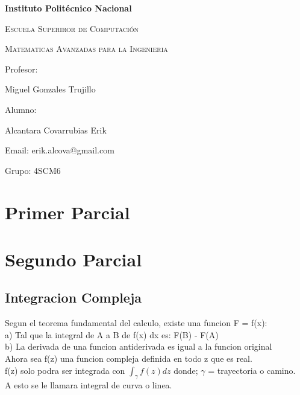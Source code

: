 \documentclass{article}
\begin{document}
\begin{titlepage}
\centering

{\bfseries\LARGE Instituto Polit\'ecnico Nacional \par}
{\scshape\Large Escuela Superiror de Computaci\'on \par}
{\scshape\Large Matematicas Avanzadas para la Ingenieria \par}
\vfill
{\Large Profesor: \par}
{\Large Miguel Gonzales Trujillo\par}
{\Large Alumno: \par}
{\Large Alcantara Covarrubias Erik \par}
{\Large Email: erik.alcova@gmail.com \par}
{\Large Grupo: 4SCM6\par}
\vfill
\end{titlepage}
\tableofcontents
\newpage
\section*{Primer Parcial}
\section*{Segundo Parcial}
\subsection*{Integracion Compleja}
Segun el teorema fundamental del calculo, existe una funcion F = f(x):
\\a) Tal que la integral de A a B de f(x) dx es: F(B) - F(A)
\\b) La derivada de una funcion antiderivada es igual a la funcion original
\\Ahora sea f(z) una funcion compleja definida en todo z que es real. 
\\f(z) solo podra ser integrada con $\int_\gamma f(z) dz$ donde; $\gamma$ = trayectoria o camino.
\\A esto se le llamara integral de curva o linea.
\end{document}

